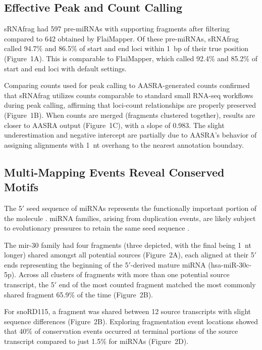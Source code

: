 \documentclass{article}
\begin{document}
\subsection{Effective Peak and Count Calling}

sRNAfrag had 597 pre-miRNAs with supporting fragments after filtering compared to 642 obtained by FlaiMapper. Of these pre-miRNAs, sRNAfrag called 94.7\% and 86.5\% of start and end loci within 1~bp of their true position (Figure~1A). This is comparable to FlaiMapper, which called 92.4\% and 85.2\% of start and end loci with default settings.

Comparing counts used for peak calling to AASRA-generated counts confirmed that sRNAfrag utilizes counts comparable to standard small RNA-seq workflows during peak calling, affirming that loci-count relationships are properly preserved (Figure~1B). When counts are merged (fragments clustered together), results are closer to AASRA output (Figure~1C), with a slope of 0.983. The slight underestimation and negative intercept are partially due to AASRA's behavior of assigning alignments with 1~nt overhang to the nearest annotation boundary.

\subsection{Multi-Mapping Events Reveal Conserved Motifs}

The 5$'$ seed sequence of miRNAs represents the functionally important portion of the molecule \citep{wu2012stability}. miRNA families, arising from duplication events, are likely subject to evolutionary pressures to retain the same seed sequence \citep{meunier2013novel}.

The mir-30 family had four fragments (three depicted, with the final being 1~nt longer) shared amongst all potential sources (Figure~2A), each aligned at their 5$'$ ends representing the beginning of the 5$'$-derived mature miRNA (hsa-miR-30c-5p). Across all clusters of fragments with more than one potential source transcript, the 5$'$ end of the most counted fragment matched the most commonly shared fragment 65.9\% of the time (Figure~2B).

For snoRD115, a fragment was shared between 12 source transcripts with slight sequence differences (Figure~2B). Exploring fragmentation event locations showed that 40\% of conservation events occurred at terminal portions of the source transcript compared to just 1.5\% for miRNAs (Figure~2D).
\end{document}
